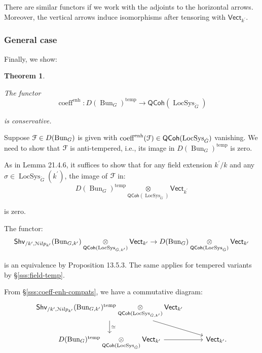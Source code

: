 \documentclass[reqno,11pt]{amsart}
\numberwithin{equation}{subsection}
\newtheorem{thm}{Theorem}[subsubsection]
\theoremstyle{remark}
\newcommand{\sF}{{\EuScript F}}
\newcommand{\sN}{{\EuScript N}}
\newcommand{\on}{\operatorname}
\newcommand{\Vect}{\mathsf{Vect}}
\newcommand{\Bun}{\on{Bun}}
\newcommand{\LocSys}{\on{LocSys}}
\newcommand{\QCoh}{\mathsf{QCoh}}
\newcommand{\coeff}{\on{coeff}}
\newcommand{\enh}{\on{enh}}
\newcommand{\Shv}{\mathsf{Shv}}
\newcommand{\temp}{\on{temp}}
\newcommand{\Nilp}{\sN ilp}
\begin{document}
\noindent There are similar functors if we work with the adjoints to the horizontal
arrows. Moreover, the vertical arrows induce isomorphisms
after tensoring with $\Vect_{k^{\prime}}$.

\subsubsection{General case}

Finally, we show:

\begin{thm}\label{t:temp-cons}

The functor
%
\[
\coeff^{\enh}:
D(\Bun_G)^{\temp} \to \QCoh(\LocSys_{\check{G}})
\]

\noindent is conservative.

\end{thm} 
 
Suppose $\sF \in D(\Bun_G)$ is given with
$\coeff^{\enh}(\sF) \in \QCoh(\LocSys_{\check{G}})$ vanishing.
We need to show that $\sF$ is anti-tempered, 
i.e., its image in $D(\Bun_G)^{\temp}$ is zero.

As in \cite{agkrrv1} Lemma 21.4.6, it suffices
to show that for any field extension $k^{\prime}/k$ and any 
$\sigma \in \LocSys_{\check{G}}(k^{\prime})$,
the image of $\sF$ in:
%
\[
D(\Bun_G)^{\temp}
\underset{\QCoh(\LocSys_{\check{G}})}{\otimes} \Vect_{k^{\prime}}
\]

\noindent is zero.

The functor: 
%
\[
\Shv_{/k^{\prime},\Nilp_{k^{\prime}}}(\Bun_{G,k^{\prime}}) 
\underset{\QCoh(\LocSys_{\check{G},k^{\prime}})}{\otimes} \Vect_{k^{\prime}}
\to 
D(\Bun_G)
\underset{\QCoh(\LocSys_{\check{G}})}{\otimes} \Vect_{k^{\prime}}
\]

\noindent is an equivalence by \cite{agkrrv1} Proposition 13.5.3.
The same applies for tempered variants by 
\S \ref{sss:field-temp}.

From \S \ref{sss:coeff-enh-compats}, we have a commutative diagram:
%
\begin{equation}\label{eq:finale}
\begin{tikzcd}
\Shv_{/k^{\prime},\Nilp_{k^{\prime}}}(\Bun_{G,k^{\prime}})^{\temp} 
\underset{\QCoh(\LocSys_{\check{G},k^{\prime}})}{\otimes} \Vect_{k^{\prime}}
\arrow[d,"\simeq"]
\arrow[dr]
\\ 
D(\Bun_G)^{\temp}
\underset{\QCoh(\LocSys_{\check{G}})}{\otimes} \Vect_{k^{\prime}}
\arrow[r] 
& 
\Vect_{k^{\prime}}.
\end{tikzcd}
\end{equation}
\end{document}
